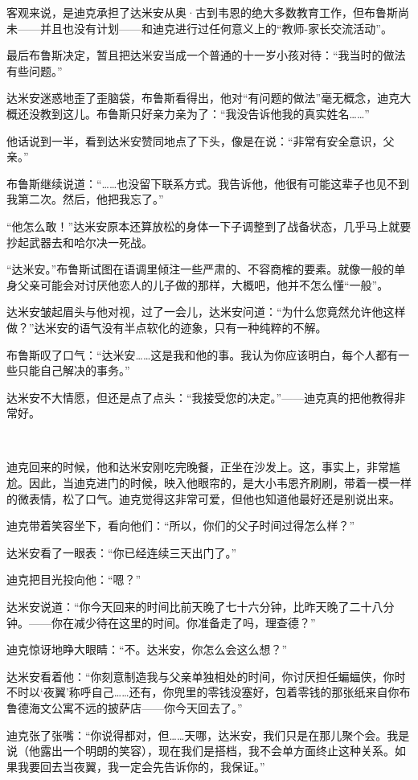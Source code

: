 \documentclass[../main]{subfiles}
\begin{document}
客观来说，是迪克承担了达米安从奥·古到韦恩的绝大多数教育工作，但布鲁斯尚未——并且也没有计划——和迪克进行过任何意义上的“教师-家长交流活动”。

最后布鲁斯决定，暂且把达米安当成一个普通的十一岁小孩对待：“我当时的做法有些问题。”

达米安迷惑地歪了歪脑袋，布鲁斯看得出，他对“有问题的做法”毫无概念，迪克大概还没教到这儿。布鲁斯只好亲力亲为了：“我没告诉他我的真实姓名……”

他话说到一半，看到达米安赞同地点了下头，像是在说：“非常有安全意识，父亲。”

布鲁斯继续说道：“……也没留下联系方式。我告诉他，他很有可能这辈子也见不到我第二次。然后，他把我忘了。”

“他怎么敢！”达米安原本还算放松的身体一下子调整到了战备状态，几乎马上就要抄起武器去和哈尔决一死战。

“达米安。”布鲁斯试图在语调里倾注一些严肃的、不容商榷的要素。就像一般的单身父亲可能会对讨厌他恋人的儿子做的那样，大概吧，他并不怎么懂“一般”。

达米安皱起眉头与他对视，过了一会儿，达米安问道：“为什么您竟然允许他这样做？”达米安的语气没有半点软化的迹象，只有一种纯粹的不解。

布鲁斯叹了口气：“达米安……这是我和他的事。我认为你应该明白，每个人都有一些只能自己解决的事务。”

达米安不大情愿，但还是点了点头：“我接受您的决定。”——迪克真的把他教得非常好。

~\

迪克回来的时候，他和达米安刚吃完晚餐，正坐在沙发上。这，事实上，非常尴尬。因此，当迪克进门的时候，映入他眼帘的，是大小韦恩齐刷刷，带着一模一样的微表情，松了口气。迪克觉得这非常可爱，但他也知道他最好还是别说出来。

迪克带着笑容坐下，看向他们：“所以，你们的父子时间过得怎么样？”

达米安看了一眼表：“你已经连续三天出门了。”

迪克把目光投向他：“嗯？”

达米安说道：“你今天回来的时间比前天晚了七十六分钟，比昨天晚了二十八分钟。——你在减少待在这里的时间。你准备走了吗，理查德？”

迪克惊讶地睁大眼睛：“不。达米安，你怎么会这么想？”

达米安看着他：“你刻意制造我与父亲单独相处的时间，你讨厌担任蝙蝠侠，你时不时以‘夜翼’称呼自己……还有，你兜里的零钱没塞好，包着零钱的那张纸来自你布鲁德海文公寓不远的披萨店——你今天回去了。”

迪克张了张嘴：“你说得都对，但……天哪，达米安，我们只是在那儿聚个会。我是说（他露出一个明朗的笑容），现在我们是搭档，我不会单方面终止这种关系。如果我要回去当夜翼，我一定会先告诉你的，我保证。”
\end{document}
